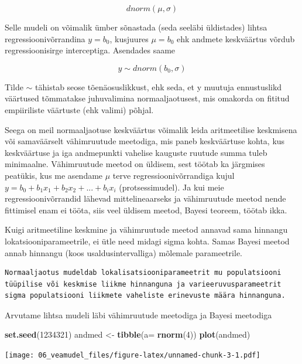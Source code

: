 \documentclass[]{book}
\newenvironment{Shaded}{\begin{snugshade}}{\end{snugshade}}
\newcommand{\KeywordTok}[1]{\textcolor[rgb]{0.13,0.29,0.53}{\textbf{#1}}}
\newcommand{\DataTypeTok}[1]{\textcolor[rgb]{0.13,0.29,0.53}{#1}}
\newcommand{\DecValTok}[1]{\textcolor[rgb]{0.00,0.00,0.81}{#1}}
\newcommand{\StringTok}[1]{\textcolor[rgb]{0.31,0.60,0.02}{#1}}
\newcommand{\NormalTok}[1]{#1}
\begin{document}
\[dnorm(\mu, \sigma)\]

Selle mudeli on võimalik ümber sõnastada (seda seeläbi üldistades)
lihtsa regressioonivõrrandina \(y = b_0\), kusjuures \(\mu = b_0\) ehk
andmete keskväärtus võrdub regressioonisirge interceptiga. Asendades
saame

\[y \sim dnorm(b_0, \sigma)\]

Tilde \(\sim\) tähistab seose tõenäosuslikkust, ehk seda, et y muutuja
ennustuslikd väärtused tõmmatakse juhuvalimina normaaljaotusest, mis
omakorda on fititud empiiriliste väärtuste (ehk valimi) põhjal.

Seega on meil normaaljaotuse keskväärtus võimalik leida aritmeetilise
keskmisena või samaväärselt vähimruutude meetodiga, mis paneb
keskväärtuse kohta, kus keskväärtuse ja iga andmepunkti vahelise
kauguste ruutude summa tuleb minimaalne. Vähimruutude meetod on üldisem,
sest töötab ka järgmises peatükis, kus me asendame \(\mu\) terve
regressioonivõrrandiga kujul
\(y = b_0 + b_1x_1 + b_2x_2 + ... + b_ix_i\) (protsessimudel). Ja kui
meie regressioonivõrrandid lähevad mittelineaarseks ja vähimruutude
meetod nende fittimisel enam ei tööta, siis veel üldisem meetod, Bayesi
teoreem, töötab ikka.

Kuigi aritmeetiline keskmine ja vähimruutude meetod annavad sama
hinnangu lokatsiooniparameetrile, ei ütle need midagi sigma kohta. Samas
Bayesi meetod annab hinnangu (koos usaldusintervalliga) mõlemale
parameetrile.

\begin{verbatim}
Normaaljaotus mudeldab lokalisatsiooniparameetrit mu populatsiooni 
tüüpilise või keskmise liikme hinnanguna ja varieeruvusparameetrit 
sigma populatsiooni liikmete vaheliste erinevuste määra hinnanguna. 
\end{verbatim}

Arvutame lihtsa mudeli läbi vähimruutude meetodiga ja Bayesi meetodiga

\begin{Shaded}
\begin{Highlighting}[]
\KeywordTok{set.seed}\NormalTok{(}\DecValTok{1234321}\NormalTok{)}
\NormalTok{andmed <-}\StringTok{ }\KeywordTok{tibble}\NormalTok{(}\DataTypeTok{a=} \KeywordTok{rnorm}\NormalTok{(}\DecValTok{4}\NormalTok{))}
\KeywordTok{plot}\NormalTok{(andmed)}
\end{Highlighting}
\end{Shaded}

\texttt{[image: 06\_veamudel\_files/figure-latex/unnamed-chunk-3-1.pdf]}
\end{document}

